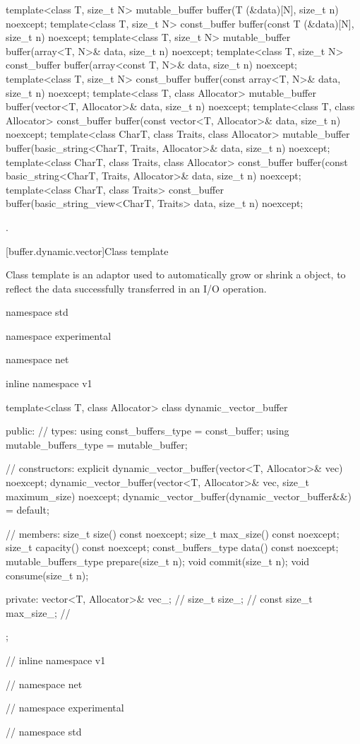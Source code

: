 \begin{itemdecl}
template<class T, size_t N>
  mutable_buffer buffer(T (&data)[N], size_t n) noexcept;
template<class T, size_t N>
  const_buffer buffer(const T (&data)[N], size_t n) noexcept;
template<class T, size_t N>
  mutable_buffer buffer(array<T, N>& data, size_t n) noexcept;
template<class T, size_t N>
  const_buffer buffer(array<const T, N>& data, size_t n) noexcept;
template<class T, size_t N>
  const_buffer buffer(const array<T, N>& data, size_t n) noexcept;
template<class T, class Allocator>
  mutable_buffer buffer(vector<T, Allocator>& data, size_t n) noexcept;
template<class T, class Allocator>
  const_buffer buffer(const vector<T, Allocator>& data, size_t n) noexcept;
template<class CharT, class Traits, class Allocator>
  mutable_buffer buffer(basic_string<CharT, Traits, Allocator>& data,
                        size_t n) noexcept;
template<class CharT, class Traits, class Allocator>
  const_buffer buffer(const basic_string<CharT, Traits, Allocator>& data,
                      size_t n) noexcept;
template<class CharT, class Traits>
  const_buffer buffer(basic_string_view<CharT, Traits> data,
                      size_t n) noexcept;
\end{itemdecl}

\begin{itemdescr}
\pnum
\returns {}.
\end{itemdescr}



[buffer.dynamic.vector]{Class template }

%
\pnum
Class template  is an adaptor used to automatically grow or shrink a  object, to reflect the data successfully transferred in an I/O operation.

\begin{codeblock}
namespace std {
namespace experimental {
namespace net {
inline namespace v1 {

  template<class T, class Allocator>
  class dynamic_vector_buffer
  {
  public:
    // types:
    using const_buffers_type = const_buffer;
    using mutable_buffers_type = mutable_buffer;

    // constructors:
    explicit dynamic_vector_buffer(vector<T, Allocator>& vec) noexcept;
    dynamic_vector_buffer(vector<T, Allocator>& vec,
                          size_t maximum_size) noexcept;
    dynamic_vector_buffer(dynamic_vector_buffer&&) = default;

    // members:
    size_t size() const noexcept;
    size_t max_size() const noexcept;
    size_t capacity() const noexcept;
    const_buffers_type data() const noexcept;
    mutable_buffers_type prepare(size_t n);
    void commit(size_t n);
    void consume(size_t n);

  private:
    vector<T, Allocator>& vec_; // \expos
    size_t size_; // \expos
    const size_t max_size_; // \expos
  };

} // inline namespace v1
} // namespace net
} // namespace experimental
} // namespace std
\end{codeblock}

